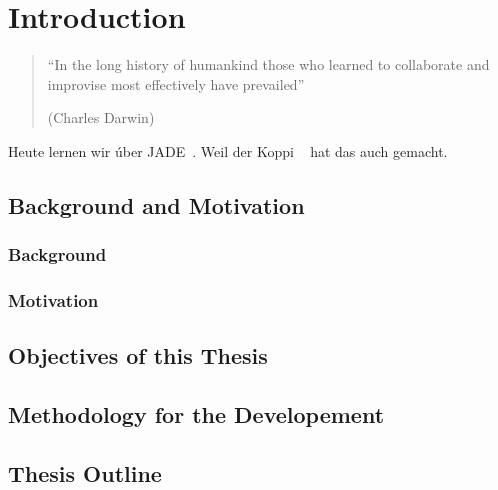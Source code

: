 \chapter{Introduction} \label{chapter:introduction}

\begin{quotation}

``In the long history of humankind those who learned to collaborate and improvise most effectively have prevailed''

\begin{flushright}
(Charles Darwin)
\end{flushright}

\end{quotation}

Heute lernen wir \'uber JADE~\cite{bellifemine_developing_2007}. Weil der Koppi ~\cite{koppensteiner_knowledge_2011} hat das auch gemacht.




\section{Background and Motivation} \label{background}

\subsection {Background}

\subsection{Motivation}

\section{Objectives of this Thesis}

\section{Methodology for the Developement}  \label{sec:metho}

\section{Thesis Outline}
